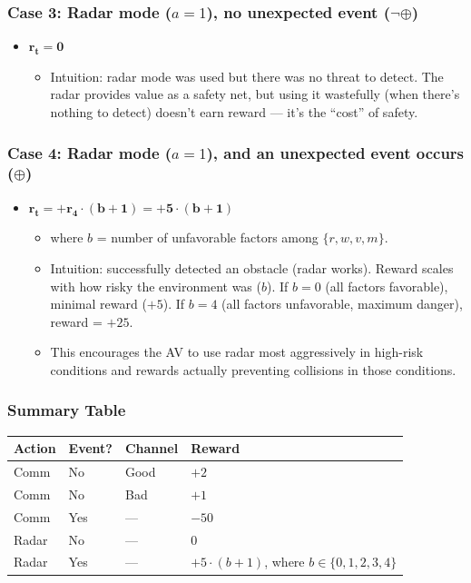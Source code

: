 \documentclass[12pt,a4paper]{article}
\begin{document}
\subsubsection{Case 3: Radar mode ($a = 1$), no unexpected event ($\neg\oplus$)}
\begin{itemize}
    \item $\mathbf{r_t = 0}$
    \begin{itemize}
        \item Intuition: radar mode was used but there was no threat to detect. The radar provides value as a safety net, but using it wastefully (when there's nothing to detect) doesn't earn reward --- it's the ``cost'' of safety.
    \end{itemize}
\end{itemize}

\subsubsection{Case 4: Radar mode ($a = 1$), and an unexpected event occurs ($\oplus$)}
\begin{itemize}
    \item $\mathbf{r_t = +r_4 \cdot (b + 1) = +5 \cdot (b + 1)}$
    \begin{itemize}
        \item where $b$ = number of unfavorable factors among $\{r, w, v, m\}$.
        \item Intuition: successfully detected an obstacle (radar works). Reward scales with how risky the environment was ($b$). If $b = 0$ (all factors favorable), minimal reward ($+5$). If $b = 4$ (all factors unfavorable, maximum danger), reward = $+25$.
        \item This encourages the AV to use radar most aggressively in high-risk conditions and rewards actually preventing collisions in those conditions.
    \end{itemize}
\end{itemize}

\subsubsection{Summary Table}

\begin{table}[h]
\centering
\begin{tabular}{llll}
\toprule
Action & Event? & Channel & Reward \\
\midrule
Comm & No & Good & $+2$ \\
Comm & No & Bad & $+1$ \\
Comm & Yes & --- & $-50$ \\
Radar & No & --- & $0$ \\
Radar & Yes & --- & $+5 \cdot (b+1)$, where $b \in \{0,1,2,3,4\}$ \\
\bottomrule
\end{tabular}
\end{table}
\end{document}
